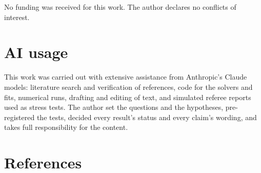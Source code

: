 \documentclass[
  10pt,
]{article}
\begin{document}
No funding was received for this work. The author declares no conflicts of interest.

\section{AI usage}\label{ai-usage}

This work was carried out with extensive assistance from Anthropic's
Claude models: literature search and verification of references, code
for the solvers and fits, numerical runs, drafting and editing of text,
and simulated referee reports used as stress tests. The author set the
questions and the hypotheses, pre-registered the tests, decided every
result's status and every claim's wording, and takes full responsibility
for the content.

\section{References}\label{references}
\end{document}
